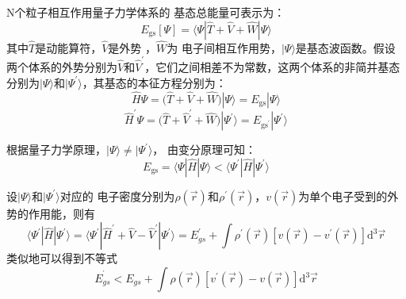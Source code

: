 N个粒子相互作用量子力学体系的%
{基态总能量}可表示为：
\begin{equation}
	{E_{\mathrm{gs}}[\Psi]}%
=\langle\Psi%
|\hat{T}+\hat{V}+\hat{W}|\Psi%
\rangle
	\label{eq:DFT_01}
\end{equation}
其中$\hat{T}$是动能算符，$\hat{V}$是外势%
，$\hat{W}$为%
{电}子间相互作用势{，$|\Psi\rangle$是基态波函数}。假设两个体系的外势分别为$\hat{V}$和$\hat V^{\prime}$，它们之间相差不为常数，这两个体系的非简并基态分别为$|\Psi\rangle$和$|\Psi^{\prime}\rangle$，其基态的本征方程分别为：
$${\hat H\Psi=}\bigl(\hat{T}+\hat{V}+\hat{W}\bigr)|\Psi\rangle=E_{\mathrm{gs}}|\Psi\rangle$$
$${\hat H^{\prime}\Psi=}\bigl(\hat{T}+\hat V^{\prime}+\hat{W}\bigr)|\Psi^{\prime}\rangle=E_{\mathrm{gs}^{\prime}}|\Psi^{\prime}\rangle$$

{根据量子力学原理，}$|\Psi\rangle{\neq}|\Psi^{\prime}\rangle$，%
由变分原理可知：
$$E_{\mathrm{gs}}=\langle\Psi|\hat{H}|\Psi\rangle<\langle\Psi^{\prime}|\hat{H}|\Psi^{\prime}\rangle$$

设$|\Psi\rangle$和$|\Psi^{\prime}\rangle$对应的%
{电}子密度分别为$\rho(\vec{r})
$和$\rho^{\prime}(\vec{r})$，{$v(\vec r)$为单个电子受到的外势的作用能，则}有
$$\langle\Psi^{\prime}|\hat{H}|\Psi^{\prime}\rangle=\langle\Psi^{\prime}|\hat H^{\prime}+\hat{V}-\hat V^{\prime}|\Psi^{\prime}\rangle=E^{\prime}_{gs}+\int{\rho^{\prime}(\vec{r})[v(\vec{r})-v^{\prime}(\vec{r})]\textrm{d}^3\vec{r}}$$
{类似地}可以得到不等式
$$E^{^{\prime}}_{gs}<E_{gs}+\int{\rho(\vec{r})[v^{\prime}(\vec{r})-v(\vec{r})]\textrm{d}^{3}\vec{r}}$$

